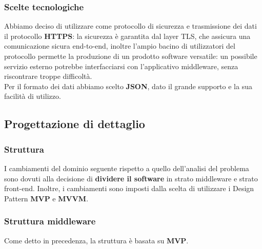 \documentclass[a4paper]{article}
\begin{document}
\subsubsection{Scelte tecnologiche}
Abbiamo deciso di utilizzare come protocollo di sicurezza e trasmissione dei dati il protocollo \textbf{HTTPS}: la sicurezza è garantita dal layer TLS, che assicura una comunicazione sicura end-to-end, inoltre l'ampio bacino di utilizzatori del protocollo permette la produzione di un prodotto software versatile: un possibile servizio esterno potrebbe interfacciarsi con l'applicativo middleware, senza riscontrare troppe difficoltà.\\Per il formato dei dati abbiamo scelto \textbf{JSON}, dato il grande supporto e la sua facilità di utilizzo.

\newpage

\subsection{Progettazione di dettaglio}


\subsubsection{Struttura}

I cambiamenti del dominio seguente rispetto a quello dell’analisi del problema sono dovuti
alla decisione di \textbf{dividere il software} in strato middleware e strato front-end. Inoltre, i cambiamenti sono imposti dalla scelta di utilizzare i Design Pattern \textbf{MVP} e \textbf{MVVM}.

\subsubsection{Struttura middleware}


Come detto in precedenza, la struttura è basata su \textbf{MVP}.
\end{document}
